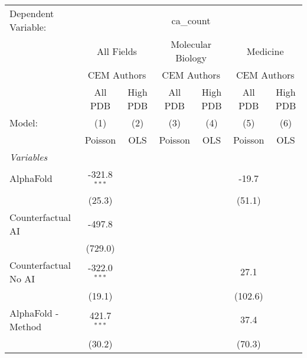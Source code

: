 \begingroup
\centering
\begin{tabular}{lcccccc}
   \tabularnewline \midrule \midrule
   Dependent Variable: & \multicolumn{6}{c}{ca\_count}\\
 & \multicolumn{2}{c}{All Fields} & \multicolumn{2}{c}{Molecular Biology} & \multicolumn{2}{c}{Medicine} \\
\cmidrule(lr){2-3} \cmidrule(lr){4-5} \cmidrule(lr){6-7}
 & \multicolumn{2}{c}{CEM Authors} & \multicolumn{2}{c}{CEM Authors} & \multicolumn{2}{c}{CEM Authors} \\
\cmidrule(lr){2-3} \cmidrule(lr){4-5} \cmidrule(lr){6-7}
 & \multicolumn{1}{c}{All PDB} & \multicolumn{1}{c}{High PDB} & \multicolumn{1}{c}{All PDB} & \multicolumn{1}{c}{High PDB} & \multicolumn{1}{c}{All PDB} & \multicolumn{1}{c}{High PDB} \\
\cmidrule(lr){2-2} \cmidrule(lr){3-3} \cmidrule(lr){4-4} \cmidrule(lr){5-5} \cmidrule(lr){6-6} \cmidrule(lr){7-7}
   Model:                                                     & (1)            & (2)  & (3)     & (4)  & (5)        & (6)\\  
                                                              &  Poisson       & OLS  & Poisson & OLS  & Poisson    & OLS\\  
   \midrule
   \emph{Variables}\\
   AlphaFold                                                  & -321.8$^{***}$ &      &         &      & -19.7      &   \\   
                                                              & (25.3)         &      &         &      & (51.1)     &   \\   
   Counterfactual AI                                          & -497.8         &      &         &      &            &   \\   
                                                              & (729.0)        &      &         &      &            &   \\   
   Counterfactual No AI                                       & -322.0$^{***}$ &      &         &      & 27.1       &   \\   
                                                              & (19.1)         &      &         &      & (102.6)    &   \\   
   AlphaFold - Method                                         & 421.7$^{***}$  &      &         &      & 37.4       &   \\   
                                                              & (30.2)         &      &         &      & (70.3)     &   \\   

\end{tabular}
